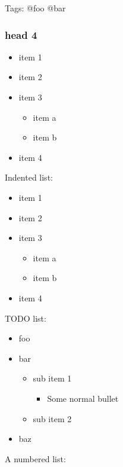 Tags: @foo @bar





\subsubsection{head 4}



\begin{itemize}
\item item 1
\item item 2
\item item 3
	\begin{itemize}
	\item item a
	\item item b
	\end{itemize}
\item item 4
\end{itemize}




Indented list:

	\begin{itemize}
	\item item 1
	\item item 2
	\item item 3
		\begin{itemize}
		\item item a
		\item item b
		\end{itemize}
	\item item 4
	\end{itemize}




TODO list:

\begin{itemize}
\item[\Square] foo
\item[\CheckedBox] bar
	\begin{itemize}
	\item[\CheckedBox] sub item 1
		\begin{itemize}
		\item Some normal bullet
		\end{itemize}
	\item[\CheckedBox] sub item 2
	\end{itemize}
\item[\XBox] baz
\end{itemize}




A numbered list:

